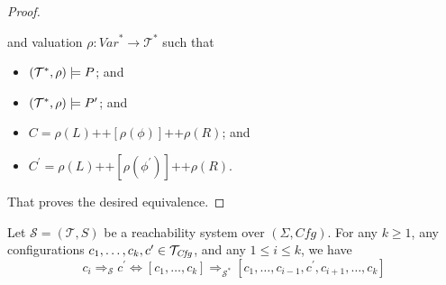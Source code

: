 \begin{proof}
\begin{proofenv}
    and valuation $\rho : \mathit{Var}^* \to \mathcal{T}^*$ such that
    \begin{itemize}
        \item $(\mathcal{T}^*, \rho) \models P$; and
        \item $(\mathcal{T}^*, \rho) \models P^\prime$; and
        \item $C = \rho(L) \texttt{++} [\rho(\phi)] \texttt{++} \rho(R)$; and
        \item $C^\prime = \rho(L)
        \texttt{++} [\rho(\phi^\prime)] \texttt{++} \rho(R)$.
    \end{itemize}
\end{proofenv}
That proves the desired equivalence.
\end{proof}


\begin{lemma}\label{lem:compositeStep}
    Let $\mathcal{S} = (\mathcal{T}, S)$ be a reachability system over $(\Sigma, \mathit{Cfg})$.
    For any $k \geq 1$, any configurations $c_1,\ldots,c_k, c^\prime \in \mathcal{T}_{\mathit{Cfg}}$, and any $1 \leq i \leq k$,
    we have
    \begin{equation*}
        c_i \Rightarrow_{\mathcal{S}} c^\prime
                    \iff
        [c_1,\ldots,c_k] \Rightarrow_{\mathcal{S}^*} [c_1, \ldots, c_{i-1}, c^\prime, c_{i+1}, \ldots, c_k]
    \end{equation*}
\end{lemma}
